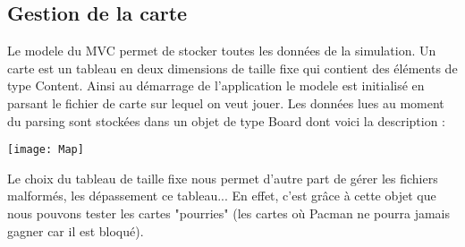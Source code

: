 \subsection{Gestion de la carte}

Le modele du MVC permet de stocker toutes les données de la simulation. Un carte est un tableau en deux dimensions de taille fixe qui contient des éléments de type Content. Ainsi au démarrage de l'application le modele est initialisé en parsant le fichier de carte sur lequel on veut jouer. Les données lues au moment du parsing sont stockées dans un objet de type Board dont voici la description : \\[0.5cm]
\centerline{\texttt{[image: Map]}}

Le choix du tableau de taille fixe nous permet d'autre part de gérer les fichiers malformés, les dépassement ce tableau... En effet, c'est grâce à cette objet que nous pouvons tester les cartes "pourries" (les cartes où Pacman ne pourra jamais gagner car il est bloqué).
